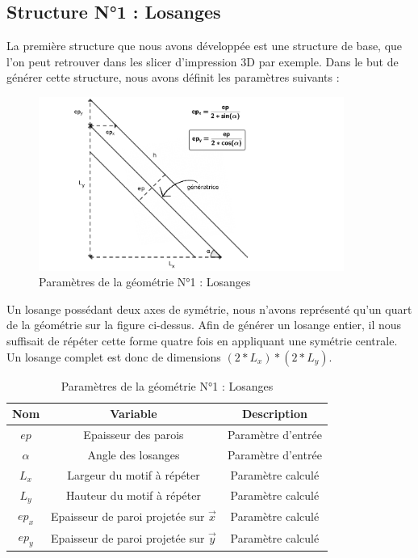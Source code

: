 \documentclass[a4paper]{article}
\begin{document}
	\subsection{Structure N°1 : Losanges}
	\label{losanges}
	\hspace{0.5cm}La première structure que nous avons développée est une structure de base, que l’on peut retrouver dans les slicer d’impression 3D par exemple. Dans le but de générer cette structure, nous avons définit les paramètres suivants :
	
	\begin{figure}[H]
		\centering
		\includegraphics[width=10cm]{Images/5/losanges.pdf}
		\caption{Paramètres de la géométrie N°1 : Losanges}
		\label{schema_losange}
	\end{figure}
	
	Un losange possédant deux axes de symétrie, nous n’avons représenté qu’un quart de la géométrie sur la figure ci-dessus. Afin de générer un losange entier, il nous suffisait de répéter cette forme quatre fois en appliquant une symétrie centrale. Un losange complet est donc de dimensions $(2* L_x)*(2*L_y).$
	
	\begin{table}[h]
		\centering
		\begin{tabular}{|c|c|c|}
			\hline
			\rowcolor{Gray}
			\textbf{Nom} & \textbf{Variable} & \textbf{Description} \\
			\hline\hline
			$ep$ & Epaisseur des parois & Paramètre d'entrée \\
			$\alpha$ & Angle des losanges & Paramètre d'entrée \\
			$L_x$ & Largeur du motif à répéter & Paramètre calculé \\
			$L_y$ & Hauteur du motif à répéter & Paramètre calculé \\
			$ep_x$ & Epaisseur de paroi projetée sur $\vec{x}$ & Paramètre calculé \\
			$ep_y$ & Epaisseur de paroi projetée sur $\vec{y}$ & Paramètre calculé \\
			\hline
		\end{tabular}
		\caption{Paramètres de la géométrie N°1 : Losanges}
	\end{table}
	
\end{document}
